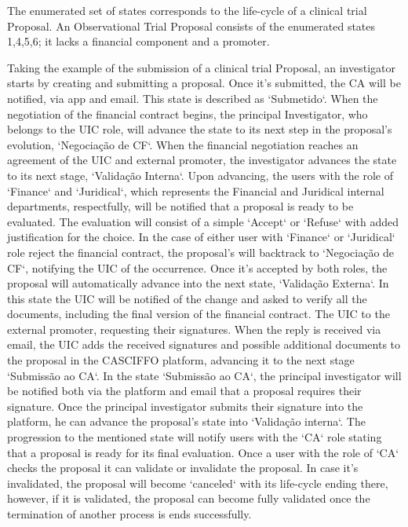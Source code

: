 The enumerated set of states corresponds to the life-cycle of a clinical trial Proposal. An Observational Trial Proposal consists of the enumerated states {1,4,5,6}; it lacks a financial component and a promoter.  

Taking the example of the submission of a clinical trial Proposal, an investigator starts by creating and submitting a proposal. Once it's submitted, the CA will be notified, via app and email. This state is described as `Submetido`.  
When the negotiation of the financial contract begins, the principal Investigator, who belongs to the UIC role, will advance the state to its next step in the proposal's evolution, `Negociação de CF`.  
When the financial negotiation reaches an agreement of the UIC and external promoter, the investigator advances the state to its next stage, `Validação Interna`. Upon advancing, the users with the role of `Finance` and `Juridical`, which represents the Financial and Juridical internal departments, respectfully, will be notified that a proposal is ready to be evaluated. The evaluation will consist of a simple `Accept` or `Refuse` with added justification for the choice. In the case of either user with `Finance` or `Juridical` role reject the financial contract, the proposal's will backtrack to `Negociação de CF`, notifying the UIC of the occurrence.  
Once it's accepted by both roles, the proposal will automatically advance into the next state, `Validação Externa`. In this state the UIC will be notified of the change and asked to verify all the documents, including the final version of the financial contract. The UIC to the external promoter, requesting their signatures. When the reply is received via email, the UIC adds the received signatures and possible additional documents to the proposal in the CASCIFFO platform, advancing it to the next stage `Submissão ao CA`.  
In the state `Submissão ao CA`, the principal investigator will be notified both via the platform and email that a proposal requires their signature. Once the principal investigator submits their signature into the platform, he can advance the proposal's state into `Validação interna`. The progression to the mentioned state will notify users with the `CA` role stating that a proposal is ready for its final evaluation.  
Once a user with the role of `CA` checks the proposal it can validate or invalidate the proposal. In case it's invalidated, the proposal will become `canceled` with its life-cycle ending there, however, if it is validated, the proposal can become fully validated once the termination of another process is ends successfully.  
